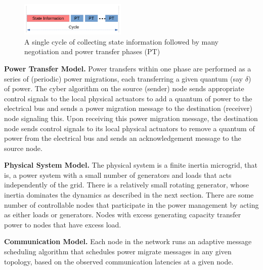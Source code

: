 \begin{figure}[htb]
  \begin{center}
    \includegraphics[width=0.45\textwidth]{Figures/cycle_fig.png}
  \caption{A single cycle of collecting state information followed by many negotiation and power transfer phases (PT)}
  \label{fig:cycle}
  \end{center}
\end{figure}

{\bf Power Transfer Model.} Power transfers within one phase are performed as a
series of (periodic) power migrations, each transferring a given quantum (say
$\delta$) of power. The cyber algorithm on the source (sender) node sends
appropriate control signals to the local physical actuators to add a quantum of
power to the electrical bus and sends a power migration message to the
destination (receiver) node signaling this. Upon receiving this power migration
message, the destination node sends control signals to its local physical
actuators to remove a quantum of power from the electrical bus and sends an
acknowledgement message to the source node.

{\bf Physical System Model.} The physical system is a finite inertia microgrid,
that is, a power system with a small number of generators and loads that acts
independently of the grid. There is a relatively small rotating generator,
whose inertia dominates the dynamics as described in the next section. There
are some number of controllable nodes that participate in the power management
by acting as either loads or generators. Nodes with excess generating capacity
transfer power to nodes that have excess load.

{\bf Communication Model.} 
Each node in the network runs an adaptive message scheduling algorithm that schedules power migrate messages in any given 
topology, based on the observed communication latencies at a given node. 
